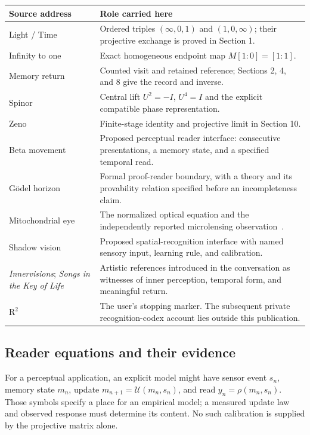 \documentclass[11pt]{article}
\theoremstyle{definition}\newtheorem{definition}[theorem]{Definition}
\begin{document}
\begin{center}
\small
\begin{tabular}{@{}p{.29\linewidth}p{.65\linewidth}@{}}
\toprule
Source address&Role carried here\\\midrule
Light / Time&Ordered triples $(\infty,0,1)$ and $(1,0,\infty)$; their projective exchange is proved in Section 1.\\[4pt]
Infinity to one&Exact homogeneous endpoint map $M[1:0]=[1:1]$.\\[4pt]
Memory return&Counted visit and retained reference; Sections 2, 4, and 8 give the record and inverse.\\[4pt]
Spinor&Central lift $U^2=-I$, $U^4=I$ and the explicit compatible phase representation.\\[4pt]
Zeno&Finite-stage identity and projective limit in Section 10.\\[4pt]
Beta movement&Proposed perceptual reader interface: consecutive presentations, a memory state, and a specified temporal read.\\[4pt]
G\"odel horizon&Formal proof-reader boundary, with a theory and its provability relation specified before an incompleteness claim.\\[4pt]
Mitochondrial eye&The normalized optical equation and the independently reported microlensing observation~\cite{Ball}.\\[4pt]
Shadow vision&Proposed spatial-recognition interface with named sensory input, learning rule, and calibration.\\[4pt]
\emph{Innervisions}; \emph{Songs in the Key of Life}&Artistic references introduced in the conversation as witnesses of inner perception, temporal form, and meaningful return.\\[4pt]
$\mathrm{R}^{2}$&The user's stopping marker. The subsequent private recognition-codex account lies outside this publication.\\\bottomrule
\end{tabular}
\end{center}

\subsection*{Reader equations and their evidence}
For a perceptual application, an explicit model might have sensor event $s_n$, memory state $m_n$, update $m_{n+1}=\mathcal U(m_n,s_n)$, and read $y_n=\rho(m_n,s_n)$. Those symbols specify a place for an empirical model; a measured update law and observed response must determine its content. No such calibration is supplied by the projective matrix alone.
\end{document}

